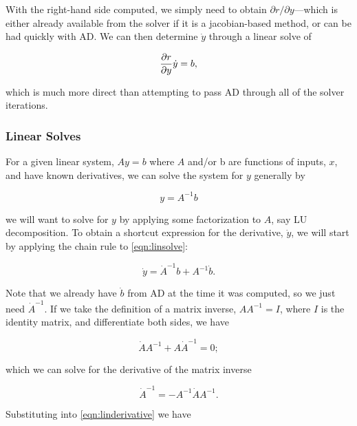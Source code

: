 With the right-hand side computed, we simply need to obtain \(\partial r/ \partial y\)---which is either already available from the solver if it is a jacobian-based method, or can be had quickly with AD.
%
We can then determine \(\dot{y}\) through a linear solve of

\begin{equation}
    \frac{\partial r}{\partial y} \dot{y} = b,
\end{equation}

\noindent which is much more direct than attempting to pass AD through all of the solver iterations.


\subsubsection{Linear Solves}

For a given linear system, \(Ay=b\) where \(A\) and/or b are functions of inputs, \(x\), and have known derivatives, we can solve the system for \(y\) generally by

\begin{equation}
    \label{eqn:linsolve}
    y = A^{-1}b
\end{equation}

\where we will want to solve for \(y\) by applying some factorization to \(A\), say LU decomposition.
%
To obtain a shortcut expression for the derivative, \(\dot{y}\), we will start by applying the chain rule to \cref{eqn:linsolve}:

\begin{equation}
    \label{eqn:linderivative}
    \dot{y} = \dot{A}^{-1}b + A^{-1}\dot{b}.
\end{equation}

\noindent Note that we already have \(\dot{b}\) from AD at the time it was computed, so we just need \(\dot{A}^{-1}\).
%
If we take the definition of a matrix inverse, \(AA^{-1} = I\), where \(I\) is the identity matrix, and differentiate both sides, we have

\begin{equation}
    \dot{A}A^{-1}+A\dot{A}^{-1} = 0;
\end{equation}

\noindent which we can solve for the derivative of the matrix inverse

\begin{equation}
    \dot{A}^{-1}=-A^{-1}\dot{A}A^{-1}.
\end{equation}

\noindent Substituting into \cref{eqn:linderivative} we have

